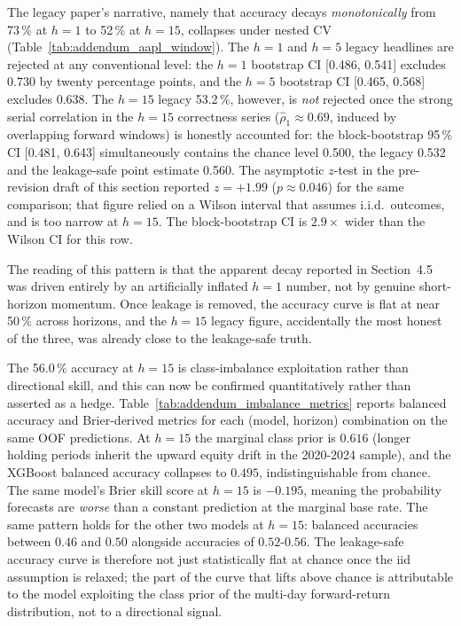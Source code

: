 \documentclass{rQUF2e}
\begin{document}
\noindent The legacy paper's narrative, namely that accuracy
decays \emph{monotonically} from 73\,\% at $h=1$ to 52\,\% at
$h=15$, collapses under nested CV
(Table~\ref{tab:addendum_aapl_window}). The $h=1$ and $h=5$ legacy
headlines are rejected at any conventional level: the $h=1$
bootstrap CI [0.486, 0.541] excludes 0.730 by twenty
percentage points, and the $h=5$ bootstrap CI [0.465, 0.568]
excludes 0.638. The $h=15$ legacy 53.2\,\%, however, is
\emph{not} rejected once the strong serial correlation in the
$h=15$ correctness series ($\hat{\rho}_1 \approx 0.69$, induced
by overlapping forward windows) is honestly accounted for: the
block-bootstrap 95\,\% CI [0.481, 0.643] simultaneously contains
the chance level 0.500, the legacy 0.532 and the leakage-safe
point estimate 0.560. The asymptotic $z$-test in the
pre-revision draft of this section reported $z=+1.99$
($p\approx 0.046$) for the same comparison; that figure relied
on a Wilson interval that assumes i.i.d.\ outcomes, and is too
narrow at $h=15$. The block-bootstrap CI is $2.9\times$ wider
than the Wilson CI for this row.

\noindent The reading of this pattern is that the apparent decay
reported in Section~4.5 was driven entirely by an artificially
inflated $h=1$ number, not by genuine short-horizon momentum.
Once leakage is removed, the accuracy curve is flat at near
50\,\% across horizons, and the $h=15$ legacy figure, accidentally
the most honest of the three, was already close to the
leakage-safe truth.

\noindent The 56.0\,\% accuracy at $h=15$ is class-imbalance
exploitation rather than directional skill, and this can now be
confirmed quantitatively rather than asserted as a hedge.
Table~\ref{tab:addendum_imbalance_metrics} reports balanced
accuracy and Brier-derived metrics for each (model, horizon)
combination on the same OOF predictions. At $h=15$ the marginal
class prior is $0.616$ (longer holding periods inherit the
upward equity drift in the 2020-2024 sample), and the XGBoost
balanced accuracy collapses to $0.495$, indistinguishable from
chance. The same model's Brier skill score at $h=15$ is $-0.195$,
meaning the probability forecasts are \emph{worse} than a
constant prediction at the marginal base rate. The same pattern
holds for the other two models at $h=15$: balanced accuracies
between $0.46$ and $0.50$ alongside accuracies of $0.52$-$0.56$.
The leakage-safe accuracy curve is therefore not just
statistically flat at chance once the iid assumption is
relaxed; the part of the curve that lifts above chance is
attributable to the model exploiting the class prior of the
multi-day forward-return distribution, not to a directional
signal.
\end{document}
